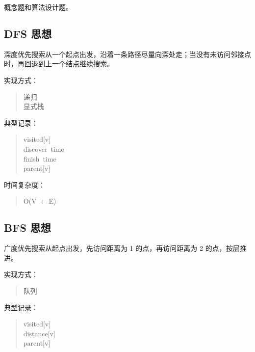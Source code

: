 \documentclass[UTF8,zihao=-4]{ctexart}
\begin{document}
概念题和算法设计题。

\subsection*{DFS 思想}

深度优先搜索从一个起点出发，沿着一条路径尽量向深处走；当没有未访问邻接点时，再回退到上一个结点继续搜索。

实现方式：

\begin{quote}
\small\ttfamily\raggedright
\relax 递归\\
\relax 显式栈\\
\end{quote}

典型记录：

\begin{quote}
\small\ttfamily\raggedright
\relax visited[v]\\
\relax discover\ time\\
\relax finish\ time\\
\relax parent[v]\\
\end{quote}

时间复杂度：

\begin{quote}
\small\ttfamily\raggedright
\relax O(V\ +\ E)\\
\end{quote}

\subsection*{BFS 思想}

广度优先搜索从起点出发，先访问距离为 1 的点，再访问距离为 2 的点，按层推进。

实现方式：

\begin{quote}
\small\ttfamily\raggedright
\relax 队列\\
\end{quote}

典型记录：

\begin{quote}
\small\ttfamily\raggedright
\relax visited[v]\\
\relax distance[v]\\
\relax parent[v]\\
\end{quote}
\end{document}
